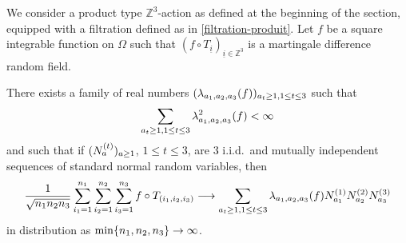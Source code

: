 \documentclass[AHL,Unicode,longabstracts,published]{cedram}
\newcommand{\Z}{\mathbb{Z}}
\newcommand{\pr}[1]{\left(#1\right)}
\renewcommand*{\to}{\mathchoice{\longrightarrow}{\rightarrow}{\rightarrow}{\rightarrow}}
\let\originalleft\left
\let\originalright\right
\renewcommand{\left}{\mathopen{}\mathclose\bgroup\originalleft}
\renewcommand{\right}{\aftergroup\egroup\originalright}
\begin{document}
\begin{theo}\label{thm:TLC_product}
We consider a product type $\Z^3$-action as defined at the beginning of the section, equipped with a filtration defined as in \eqref{filtration-produit}. Let $f$ be a square integrable function on $\Omega$ such that $(f\circ T_{\underline{i}})_{\underline{i}\in\Z^3}$ is a martingale difference random field. 

There exists a family of real numbers $(\lambda_{a_1,a_2,a_3}\pr{f})_{a_t\geq 1, 1\leq t\leq 3}$
such that
\[
\sum_{a_t\geq 1, 1\leq t\leq 3}\lambda_{a_1,a_2,a_3}^2\pr{f}<\infty
\]
and such that if $(N_a^{\pr{t}})_{a\geq 1}$, $1\leq t\leq 3$, are $3$
i.i.d.\ and mutually independent sequences of standard normal random variables, then
\begin{equation*}
\frac1{\sqrt{n_1n_2 n_3}}\sum_{i_1=1}^{n_1}\sum_{i_2=1}^{n_2}\sum_{i_3=1}^{n_3} f\circ T_{(i_1,i_2,i_3)}\to \sum_{a_t\geq 1, 1\leq t\leq 3} \lambda_{a_1,a_2,a_3}\pr{f} N_{a_1}^{\pr{1}}N_{a_2}^{\pr{2}} N_{a_3}^{\pr{3}}
\end{equation*}
in distribution as $\min\{n_1,n_2,n_3\}\to\infty$.
\end{theo}
\end{document}
